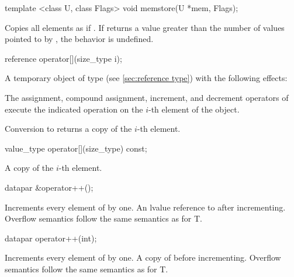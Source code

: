 \begin{itemdecl}
template <class U, class Flags> void memstore(U *mem, Flags);
\end{itemdecl}
\begin{itemdescr}
  \pnum\effects Copies all \datapar elements as if  \foralli.
  \pnum\remarks If  returns a value greater than the number of values pointed to by , the behavior is undefined.
\end{itemdescr}

\newcommand\dataparElementReference[1]{
  \pnum\returns A temporary object of type \referencetype (see \ref{sec:reference type}) with the following effects:

  \pnum\effects The assignment, compound assignment, increment, and decrement operators of \referencetype execute the indicated operation on the $i$-th element of the #1 object.

  \pnum\effects Conversion to \valuetype returns a copy of the $i$-th element.
}
\begin{itemdecl}
reference operator[](size_type i);
\end{itemdecl}
\begin{itemdescr}
  \dataparElementReference{\datapar{}}
\end{itemdescr}

\begin{itemdecl}
value_type operator[](size_type) const;
\end{itemdecl}
\begin{itemdescr}
  \pnum\returns A copy of the $i$-th element.
\end{itemdescr}

\begin{itemdecl}
datapar &operator++();
\end{itemdecl}
\begin{itemdescr}
  \pnum\effects Increments every element of  by one.
  \pnum\returns An lvalue reference to  after incrementing.
  \pnum\remarks Overflow semantics follow the same semantics as for \type T.
\end{itemdescr}

\begin{itemdecl}
datapar operator++(int);
\end{itemdecl}
\begin{itemdescr}
  \pnum\effects Increments every element of  by one.
  \pnum\returns A copy of  before incrementing.
  \pnum\remarks Overflow semantics follow the same semantics as for \type T.
\end{itemdescr}

